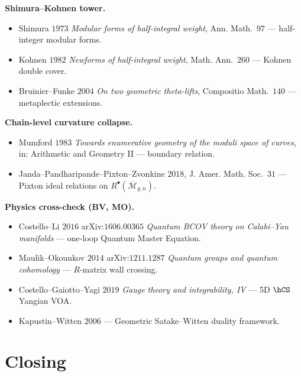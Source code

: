 \documentclass[11pt]{amsart}
\providecommand{\Mbar}{\overline{\mathcal{M}}}
\begin{document}
\noindent\textbf{Shimura--Kohnen tower.}
\begin{itemize}
\item Shimura $1973$ \emph{Modular forms of half-integral weight},
Ann. Math.~$97$ --- half-integer modular forms.
\item Kohnen $1982$ \emph{Newforms of half-integral weight},
Math. Ann.~$260$ --- Kohnen double cover.
\item Bruinier--Funke $2004$ \emph{On two geometric theta-lifts},
Compositio Math.~$140$ --- metaplectic extensions.
\end{itemize}

\noindent\textbf{Chain-level curvature collapse.}
\begin{itemize}
\item Mumford $1983$ \emph{Towards enumerative geometry of the moduli
space of curves}, in: Arithmetic and Geometry II --- boundary
relation.
\item Janda--Pandharipande--Pixton--Zvonkine $2018$, J. Amer. Math.
Soc.~$31$ --- Pixton ideal relations on $R^\bullet(\Mbar_{g, n})$.
\end{itemize}

\noindent\textbf{Physics cross-check (BV, MO).}
\begin{itemize}
\item Costello--Li $2016$ arXiv:$1606.00365$ \emph{Quantum BCOV
theory on Calabi--Yau manifolds} --- one-loop Quantum Master
Equation.
\item Maulik--Okounkov $2014$ arXiv:$1211.1287$ \emph{Quantum
groups and quantum cohomology} --- $R$-matrix wall crossing.
\item Costello--Gaiotto--Yagi $2019$ \emph{Gauge theory and
integrability, IV} --- 5D $\hCS$ Yangian VOA.
\item Kapustin--Witten $2006$ --- Geometric Satake--Witten duality
framework.
\end{itemize}

\section*{Closing}
\end{document}
